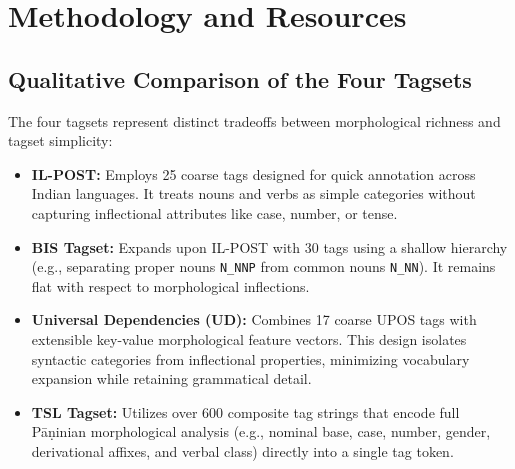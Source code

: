 \documentclass[11pt,a4paper]{article}
\begin{document}
\section{Methodology and Resources}

\subsection{Qualitative Comparison of the Four Tagsets}

The four tagsets represent distinct tradeoffs between morphological richness and tagset simplicity:
\begin{itemize}[leftmargin=1.5em, itemsep=0.2em]
    \item \textbf{IL-POST:} Employs 25 coarse tags designed for quick annotation across Indian languages. It treats nouns and verbs as simple categories without capturing inflectional attributes like case, number, or tense.
    \item \textbf{BIS Tagset:} Expands upon IL-POST with 30 tags using a shallow hierarchy (e.g., separating proper nouns \texttt{N\_NNP} from common nouns \texttt{N\_NN}). It remains flat with respect to morphological inflections.
    \item \textbf{Universal Dependencies (UD):} Combines 17 coarse UPOS tags with extensible key-value morphological feature vectors. This design isolates syntactic categories from inflectional properties, minimizing vocabulary expansion while retaining grammatical detail.
    \item \textbf{TSL Tagset:} Utilizes over 600 composite tag strings that encode full P\=a\d{n}inian morphological analysis (e.g., nominal base, case, number, gender, derivational affixes, and verbal class) directly into a single tag token.
\end{itemize}

\begin{table}[htbp]
\centering
\caption{Morphological Encoding Comparison for the word \textit{r\=ame\d{n}a} (\textit{r\=ame\d{n}a} --- ``by Rama'').}
\label{tab:morph_comparison}
\end{table}
\end{document}
